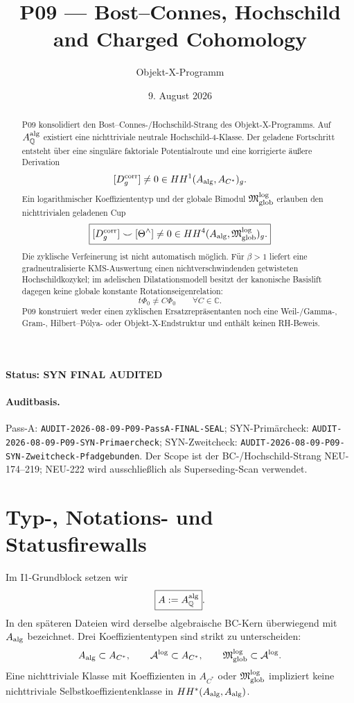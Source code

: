 \documentclass[11pt,a4paper]{article}
\title{P09 --- Bost--Connes, Hochschild and Charged Cohomology}
\author{Objekt-X-Programm}
\date{9. August 2026}
\begin{document}
\maketitle

\begin{center}
\textbf{Status: SYN FINAL AUDITED}
\end{center}

\paragraph{Auditbasis.}
Pass-A: \texttt{AUDIT-2026-08-09-P09-PassA-FINAL-SEAL};
SYN-Primärcheck: \texttt{AUDIT-2026-08-09-P09-SYN-Primaercheck};
SYN-Zweitcheck: \texttt{AUDIT-2026-08-09-P09-SYN-Zweitcheck-Pfadgebunden}.
Der Scope ist der BC-/Hochschild-Strang NEU-174--219; NEU-222 wird ausschließlich als Superseding-Scan verwendet.

\begin{abstract}
P09 konsolidiert den Bost--Connes-/Hochschild-Strang des Objekt-X-Programms. Auf
$A_{\mathbb Q}^{\rm alg}$ existiert eine nichttriviale neutrale Hochschild-4-Klasse. Der geladene Fortschritt entsteht über eine singuläre faktoriale Potentialroute und eine korrigierte äußere Derivation
\[
 [D_g^{\rm corr}]\neq0\in HH^1(A_{\rm alg},A_{C^*})_g.
\]
Ein logarithmischer Koeffiziententyp und der globale Bimodul
$\mathfrak M_{\rm glob}^{\log}$ erlauben den nichttrivialen geladenen Cup
\[
 \boxed{[D_g^{\rm corr}]\smile[\Theta^\wedge]\neq0
 \in HH^4(A_{\rm alg},\mathfrak M_{\rm glob}^{\log})_g.}
\]
Die zyklische Verfeinerung ist nicht automatisch möglich. Für $\beta>1$ liefert eine gradneutralisierte KMS-Auswertung einen nichtverschwindenden getwisteten Hochschildkozykel; im adelischen Dilatationsmodell besitzt der kanonische Basislift dagegen keine globale konstante Rotationseigenrelation:
\[
 \boxed{t\Phi_0\neq C\Phi_0\qquad\forall C\in\mathbb C.}
\]
P09 konstruiert weder einen zyklischen Ersatzrepräsentanten noch eine Weil-/Gamma-, Gram-, Hilbert--Pólya- oder Objekt-X-Endstruktur und enthält keinen RH-Beweis.
\end{abstract}

\section{Typ-, Notations- und Statusfirewalls}

Im I1-Grundblock setzen wir
\[
 \boxed{A:=A_{\mathbb Q}^{\rm alg}}.
\]
In den späteren Dateien wird derselbe algebraische BC-Kern überwiegend mit $A_{\rm alg}$ bezeichnet. Drei Koeffiziententypen sind strikt zu unterscheiden:
\[
 A_{\rm alg}\subset A_{C^*},\qquad
 \mathcal A^{\log}\subset A_{C^*},\qquad
 \mathfrak M_{\rm glob}^{\log}\subset\mathcal A^{\log}.
\]
Eine nichttriviale Klasse mit Koeffizienten in $A_{C^*}$ oder $\mathfrak M_{\rm glob}^{\log}$ impliziert keine nichttriviale Selbstkoeffizientenklasse in $HH^*(A_{\rm alg},A_{\rm alg})$.
\end{document}
